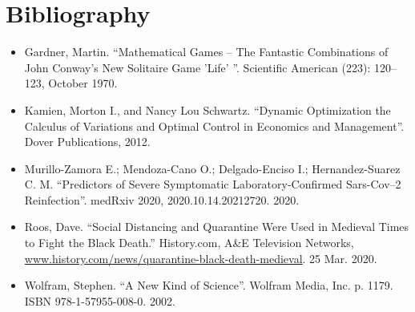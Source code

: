 \documentclass[twoside]{extarticle}                                    %
\numberwithin{equation}{section}                                       %
\begin{document}
\newpage{}                                    %
\thispagestyle{empty}                         %
\section*{Bibliography}                       %
\begin{itemize}                               %
    \item Gardner, Martin.
        ``Mathematical Games -- The Fantastic Combinations of John Conway's New Solitaire Game 'Life' ''.
        Scientific American (223): 120–123, October 1970.
    \item Kamien, Morton I., and Nancy Lou Schwartz.
        ``Dynamic Optimization the Calculus of Variations and Optimal Control in Economics and Management''.
        Dover Publications, 2012.
    \item Murillo-Zamora E.; Mendoza-Cano O.; Delgado-Enciso I.; Hernandez-Suarez C. M.
        ``Predictors of Severe Symptomatic Laboratory-Confirmed Sars-Cov–2 Reinfection''.
        medRxiv 2020, 2020.10.14.20212720. 2020.
    \item Roos, Dave.
        ``Social Distancing and Quarantine Were Used in Medieval Times to Fight the Black Death.''
        History.com, A\&E Television Networks, \url{www.history.com/news/quarantine-black-death-medieval}.
        25 Mar. 2020.
    \item Wolfram, Stephen.
        ``A New Kind of Science''.
        Wolfram Media, Inc.
        p. 1179.
        ISBN 978-1-57955-008-0.
        2002.
\end{itemize}
\end{document}
